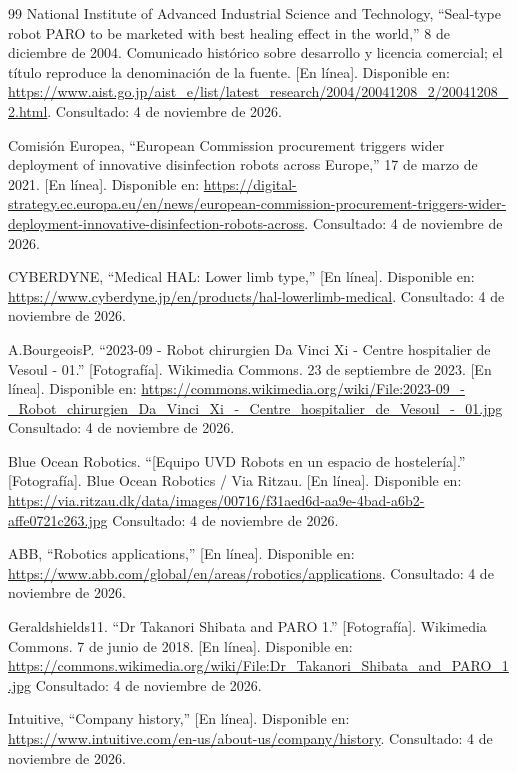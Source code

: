 \documentclass[11pt,a4paper]{article}
\begin{document}
\begin{thebibliography}{99}
National Institute of Advanced Industrial Science and Technology, ``Seal-type robot PARO to be marketed with best healing effect in the world,'' 8 de diciembre de 2004. Comunicado histórico sobre desarrollo y licencia comercial; el título reproduce la denominación de la fuente.
[En línea]. Disponible en: \url{https://www.aist.go.jp/aist_e/list/latest_research/2004/20041208_2/20041208_2.html}. Consultado: 4 de noviembre de 2026.

Comisión Europea, ``European Commission procurement triggers wider deployment of innovative disinfection robots across Europe,'' 17 de marzo de 2021. [En línea]. Disponible en: \url{https://digital-strategy.ec.europa.eu/en/news/european-commission-procurement-triggers-wider-deployment-innovative-disinfection-robots-across}. Consultado: 4 de noviembre de 2026.

CYBERDYNE, ``Medical HAL: Lower limb type,''
[En línea]. Disponible en: \url{https://www.cyberdyne.jp/en/products/hal-lowerlimb-medical}. Consultado: 4 de noviembre de 2026.

A.BourgeoisP. ``2023-09 - Robot chirurgien Da Vinci Xi - Centre hospitalier de Vesoul - 01.'' [Fotografía]. Wikimedia Commons. 23 de septiembre de 2023. [En línea]. Disponible en: \url{https://commons.wikimedia.org/wiki/File:2023-09_-_Robot_chirurgien_Da_Vinci_Xi_-_Centre_hospitalier_de_Vesoul_-_01.jpg} Consultado: 4 de noviembre de 2026.

Blue Ocean Robotics. ``[Equipo UVD Robots en un espacio de hostelería].'' [Fotografía]. Blue Ocean Robotics / Via Ritzau. [En línea]. Disponible en: \url{https://via.ritzau.dk/data/images/00716/f31aed6d-aa9e-4bad-a6b2-affe0721c263.jpg} Consultado: 4 de noviembre de 2026.

ABB, ``Robotics applications,''
[En línea]. Disponible en: \url{https://www.abb.com/global/en/areas/robotics/applications}. Consultado: 4 de noviembre de 2026.

Geraldshields11. ``Dr Takanori Shibata and PARO 1.'' [Fotografía]. Wikimedia Commons. 7 de junio de 2018. [En línea]. Disponible en: \url{https://commons.wikimedia.org/wiki/File:Dr_Takanori_Shibata_and_PARO_1.jpg} Consultado: 4 de noviembre de 2026.

Intuitive, ``Company history,'' [En línea]. Disponible en: \url{https://www.intuitive.com/en-us/about-us/company/history}. Consultado: 4 de noviembre de 2026.


\end{thebibliography}
\end{document}
